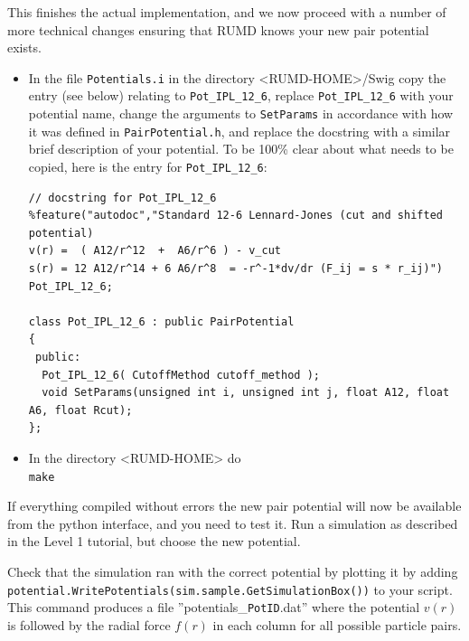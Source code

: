 This finishes the actual implementation, and we now proceed with a number of more technical changes ensuring that RUMD knows your new pair potential exists. 
\begin{itemize}
  \item In the file \verb|Potentials.i| in the directory 
        <RUMD-HOME>/Swig copy the entry (see below) relating to 
        \verb|Pot_IPL_12_6|, replace \verb|Pot_IPL_12_6| with your potential name, change the arguments to \verb|SetParams| in accordance with how it was defined in \verb|PairPotential.h|, and replace the docstring with a similar brief description of your potential. To be 100\% clear about what needs to be copied, here is the entry for \verb|Pot_IPL_12_6|:

\begin{verbatim}
// docstring for Pot_IPL_12_6
%feature("autodoc","Standard 12-6 Lennard-Jones (cut and shifted potential)
v(r) =  ( A12/r^12  +  A6/r^6 ) - v_cut
s(r) = 12 A12/r^14 + 6 A6/r^8  = -r^-1*dv/dr (F_ij = s * r_ij)") Pot_IPL_12_6;

class Pot_IPL_12_6 : public PairPotential
{
 public:
  Pot_IPL_12_6( CutoffMethod cutoff_method );
  void SetParams(unsigned int i, unsigned int j, float A12, float A6, float Rcut);
};
\end{verbatim}

  \item In the directory <RUMD-HOME> do\\
        \verb|make|        
\end{itemize}


If everything compiled without errors the new pair potential will 
now be available from the python interface, and you need to test 
it. Run a simulation as described in the Level 1 tutorial, but choose the 
new potential.  

Check that the simulation ran with the correct potential by plotting 
it by adding \\ 
\verb|potential.WritePotentials(sim.sample.GetSimulationBox())|
to your script. This command produces a file ''potentials\_\verb=PotID=.dat'' where the potential $v(r)$ is followed by the radial force $f(r)$ in each column for all 
possible particle pairs.

